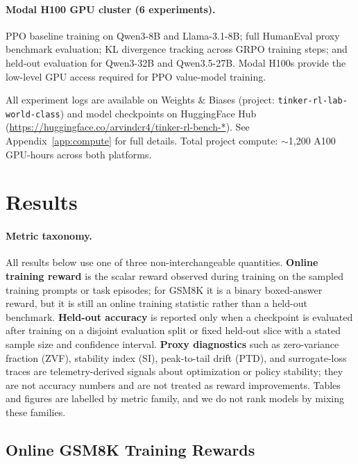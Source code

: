 \paragraph{Modal H100 GPU cluster (6 experiments).}
PPO baseline training on Qwen3-8B and Llama-3.1-8B; full HumanEval
proxy benchmark evaluation; KL divergence tracking across GRPO training steps;
and held-out evaluation for Qwen3-32B and Qwen3.5-27B. Modal H100s
provide the low-level GPU access required for PPO value-model training.

All experiment logs are available on Weights \& Biases (project:
\texttt{tinker-rl-lab-world-class}) and model checkpoints on HuggingFace
Hub (\url{https://huggingface.co/arvindcr4/tinker-rl-bench-*}).
See Appendix~\ref{app:compute} for full details. Total project compute:
$\sim$1,200 A100 GPU-hours across both platforms.

\section{Results}
\label{sec:results}

\paragraph{Metric taxonomy.}
All results below use one of three non-interchangeable quantities.  \textbf{Online
training reward} is the scalar reward observed during training on the sampled
training prompts or task episodes; for GSM8K it is a binary boxed-answer reward,
but it is still an online training statistic rather than a held-out benchmark.
\textbf{Held-out accuracy} is reported only when a checkpoint is evaluated after
training on a disjoint evaluation split or fixed held-out slice with a stated
sample size and confidence interval.  \textbf{Proxy diagnostics} such as
zero-variance fraction (ZVF), stability index (SI), peak-to-tail drift (PTD),
and surrogate-loss traces are telemetry-derived signals about optimization or
policy stability; they are not accuracy numbers and are not treated as reward
improvements.  Tables and figures are labelled by metric family, and we do not
rank models by mixing these families.



\subsection{Online GSM8K Training Rewards}
\label{sec:main_results}

